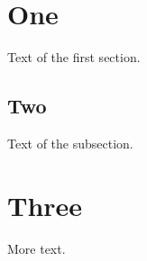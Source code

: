 \documentclass{article}
\begin{document}
\section{One}
Text of the first section.
\subsection{Two}
Text of the subsection.
\section{Three}
More text.
\end{document}
